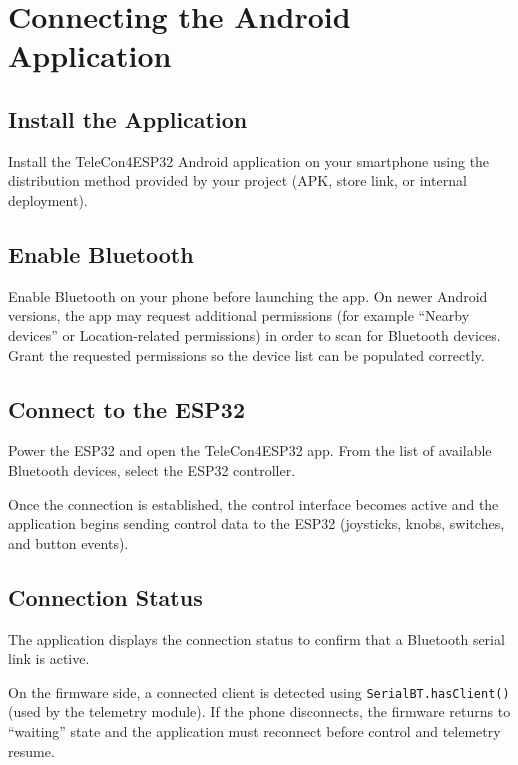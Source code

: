 \chapter{Connecting the Android Application}


\section{Install the Application}
Install the TeleCon4ESP32 Android application on your smartphone using the distribution method provided
by your project (APK, store link, or internal deployment).

\section{Enable Bluetooth}
Enable Bluetooth on your phone before launching the app. On newer Android versions, the app may request
additional permissions (for example ``Nearby devices'' or Location-related permissions) in order to scan
for Bluetooth devices. Grant the requested permissions so the device list can be populated correctly.

\section{Connect to the ESP32}
Power the ESP32 and open the TeleCon4ESP32 app. From the list of available Bluetooth devices, select the
ESP32 controller.

Once the connection is established, the control interface becomes active and the application begins sending
control data to the ESP32 (joysticks, knobs, switches, and button events).

\section{Connection Status}
The application displays the connection status to confirm that a Bluetooth serial link is active.

On the firmware side, a connected client is detected using \verb|SerialBT.hasClient()| (used by the telemetry
module). If the phone disconnects, the firmware returns to ``waiting'' state and the application must reconnect
before control and telemetry resume.

